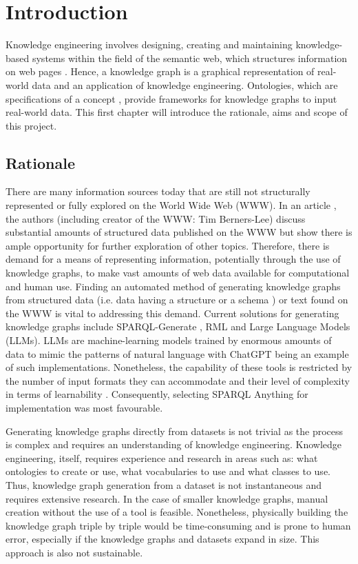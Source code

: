 \chapter{Introduction}
Knowledge engineering involves designing, creating and maintaining knowledge-based systems \cite{studer_benjamins_fensel_1998} within the field of the semantic web, which structures information on web pages \cite{berners2001semantic}. Hence, a knowledge graph is a graphical representation of real-world data and an application of knowledge engineering. Ontologies, which are specifications of a concept \cite{Breitman2007}, provide frameworks for knowledge graphs to input real-world data. This first chapter will introduce the rationale, aims and scope of this project. 

\section{Rationale}
\hspace{0.5cm} There are many information sources today that are still not structurally represented or fully explored on the World Wide Web (WWW). In an article \cite{bizer2011linked}, the authors (including creator of the WWW: Tim Berners-Lee) discuss substantial amounts of structured data published on the WWW but show there is ample opportunity for further exploration of other topics. Therefore, there is demand for a means of representing information, potentially through the use of knowledge graphs, to make vast amounts of web data available for computational and human use. Finding an automated method of generating knowledge graphs from structured data (i.e. data having a structure or a schema \cite{arasu_garcia-molina_university_2003}) or text found on the WWW is vital to addressing this demand. Current solutions for generating knowledge graphs include SPARQL-Generate \cite{sparqlgenerate}, RML \cite{rml} and Large Language Models (LLMs). LLMs are machine-learning models trained by enormous amounts of data to mimic the patterns of natural language with ChatGPT \cite{chatgptwebsite} being an example of such implementations. Nonetheless, the capability of these tools is restricted by the number of input formats they can accommodate and their level of complexity in terms of learnability \cite{sparqlanything}. Consequently, selecting SPARQL Anything \cite{sparqlanythinggithub} for implementation was most favourable. 

Generating knowledge graphs directly from datasets is not trivial as the process is complex and requires an understanding of knowledge engineering. Knowledge engineering, itself, requires experience and research in areas such as: what ontologies to create or use, what vocabularies to use and what classes to use. Thus, knowledge graph generation from a dataset is not instantaneous and requires extensive research. In the case of smaller knowledge graphs, manual creation without the use of a tool is feasible. Nonetheless, physically building the knowledge graph triple by triple would be time-consuming and is prone to human error, especially if the knowledge graphs and datasets expand in size. This approach is also not sustainable. 

